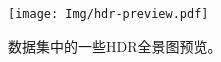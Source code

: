 \begin{figure}[!htbp]
  \centering
  \texttt{[image: Img/hdr-preview.pdf]}
  \caption{
    \label{fig:hdr-preview}
    数据集中的一些HDR全景图预览。
  }
\end{figure}